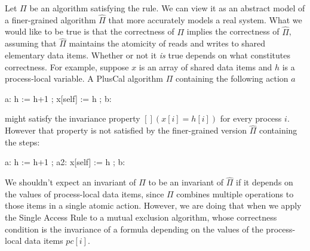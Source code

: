 \documentclass[fleqn,leqno]{article}
\begin{document}
Let $\Pi$ be an algorithm satisfying the rule.  We can view it as an
abstract model of a finer-grained algorithm $\widehat{\Pi}$ that more
accurately models a real system.  What we would like to be
true is that the correctness of $\Pi$ implies the correctness of
$\widehat{\Pi}$, assuming that $\widehat{\Pi}$ maintains the atomicity
of reads and writes to shared elementary data items.  Whether or not
it \emph{is} true depends on what constitutes correctness.  For
example, suppose $x$ is an array of shared data items and $h$ is a
process-local variable.  A PlusCal algorithm $\Pi$ containing the
following action $a$
\begin{display}
\begin{nopcal}
a: h := h+1 ; 
   x[self] := h ; 
b: 
\end{nopcal}
\begin{tlatex}
%
%
%
\end{tlatex}
\end{display}
might satisfy the invariance property $[](x[i] = h[i])$ for every
process $i$.  However that property is not satisfied by the
finer-grained version $\widehat{\Pi}$ containing the steps:
\begin{display}
\begin{nopcal}
a:  h := h+1 ; 
a2: x[self] := h ; 
b: 
\end{nopcal}
\begin{tlatex}
%
%
%
\end{tlatex}
\end{display}
We shouldn't expect an invariant of $\Pi$ to be an invariant of
$\widehat{\Pi}$ if it depends on the values of process-local data
items, since $\Pi$ combines multiple operations to those items in a
single atomic action.  However, we are doing that when 
we apply the Single Access Rule
to a mutual exclusion algorithm, whose correctness condition is the
invariance of a formula depending on the values of the process-local
data items $pc[i]$.
\end{document}
